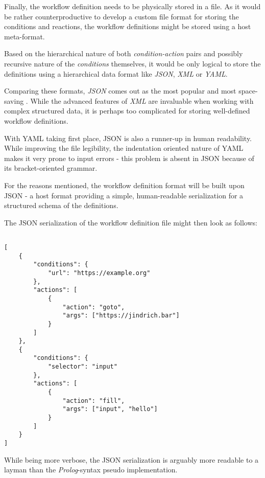 
Finally, the workflow definition needs to be physically stored in a file. 
As it would be rather counterproductive to develop a custom file format for storing the conditions and reactions, the workflow definitions might be stored using a host meta-format.

Based on the hierarchical nature of both \textit{condition-action} pairs and possibly recursive nature of the \textit{conditions} themselves, it would be only logical to store the definitions using a hierarchical data format like \textit{JSON}, \textit{XML} or \textit{YAML}.

Comparing these formats, \textit{JSON} comes out as the most popular  and most space-saving . 
While the advanced features of \textit{XML} are invaluable when working with complex structured data, it is perhaps too complicated for storing well-defined workflow definitions.

With YAML taking first place, JSON is also a runner-up in human readability.
While improving the file legibility, the indentation oriented nature of YAML makes it very prone to input errors - this problem is absent in JSON because of its bracket-oriented grammar.

For the reasons mentioned, the workflow definition format will be built upon JSON - a host format providing a simple, human-readable serialization for a structured schema of the definitions.

The JSON serialization of the workflow definition file might then look as follows:

\begin{minipage}{0.95\linewidth}
\begin{verbatim}

[
    {
        "conditions": {
            "url": "https://example.org"
        },
        "actions": [
            {
                "action": "goto",
                "args": ["https://jindrich.bar"]
            }
        ]
    },
    {
        "conditions": {
            "selector": "input"
        },
        "actions": [
            {
                "action": "fill",
                "args": ["input", "hello"]
            }
        ]
    }
]

\end{verbatim}
\end{minipage}

While being more verbose, the JSON serialization is arguably more readable to a layman than the \textit{Prolog}-syntax pseudo implementation.

